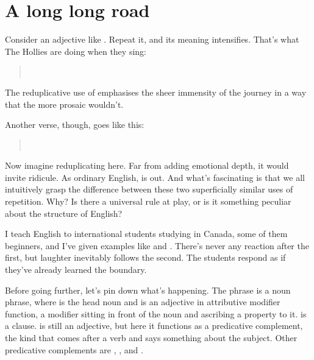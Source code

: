 \chapter{A long long road}
Consider an adjective like . Repeat it, and its meaning intensifies. That's what The Hollies are doing when they sing:

\begin{quote}
\\
\end{quote}

\noindent The reduplicative use of  emphasises the sheer immensity of the journey in a way that the more prosaic  wouldn't.

Another verse, though, goes like this:

\begin{quote}
\\
\end{quote}

Now imagine reduplicating  here. Far from adding emotional depth, it would invite ridicule. As ordinary English,  is out. And what's fascinating is that we all intuitively grasp the difference between these two superficially similar uses of repetition. Why? Is there a universal rule at play, or is it something peculiar about the structure of English?

I teach English to international students studying in Canada, some of them beginners, and I've given examples like  and . There's never any reaction after the first, but laughter inevitably follows the second. The students respond as if they've already learned the boundary.

\bigskip

Before going further, let's pin down what's happening. The phrase  is a noun phrase, where  is the head noun and  is an adjective in attributive modifier function, a modifier sitting in front of the noun and ascribing a property to it.  is a clause.  is still an adjective, but here it functions as a predicative complement, the kind that comes after a verb and says something about the subject. Other predicative complements are , , and .

